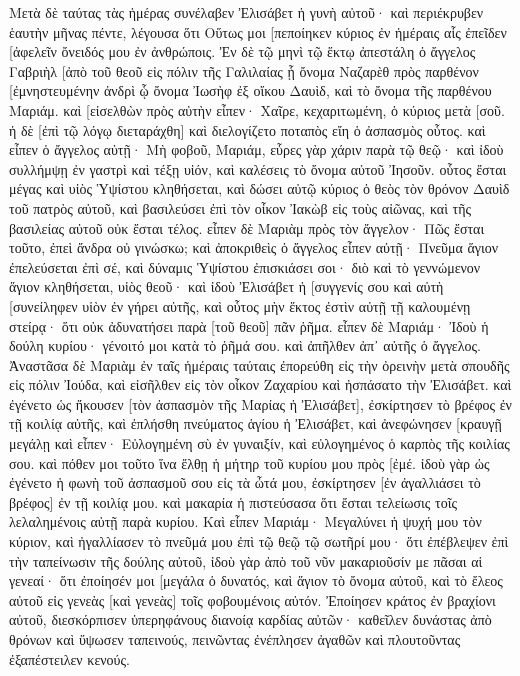 Μετὰ δὲ ταύτας τὰς ἡμέρας συνέλαβεν Ἐλισάβετ ἡ γυνὴ αὐτοῦ· καὶ περιέκρυβεν ἑαυτὴν μῆνας πέντε, λέγουσα 
ὅτι Οὕτως μοι [πεποίηκεν κύριος ἐν ἡμέραις αἷς ἐπεῖδεν [ἀφελεῖν ὄνειδός μου ἐν ἀνθρώποις. 
Ἐν δὲ τῷ μηνὶ τῷ ἕκτῳ ἀπεστάλη ὁ ἄγγελος Γαβριὴλ [ἀπὸ τοῦ θεοῦ εἰς πόλιν τῆς Γαλιλαίας ᾗ ὄνομα Ναζαρὲθ 
πρὸς παρθένον [ἐμνηστευμένην ἀνδρὶ ᾧ ὄνομα Ἰωσὴφ ἐξ οἴκου Δαυὶδ, καὶ τὸ ὄνομα τῆς παρθένου Μαριάμ. 
καὶ [εἰσελθὼν πρὸς αὐτὴν εἶπεν· Χαῖρε, κεχαριτωμένη, ὁ κύριος μετὰ [σοῦ. 
ἡ δὲ [ἐπὶ τῷ λόγῳ διεταράχθη] καὶ διελογίζετο ποταπὸς εἴη ὁ ἀσπασμὸς οὗτος. 
καὶ εἶπεν ὁ ἄγγελος αὐτῇ· Μὴ φοβοῦ, Μαριάμ, εὗρες γὰρ χάριν παρὰ τῷ θεῷ· 
καὶ ἰδοὺ συλλήμψῃ ἐν γαστρὶ καὶ τέξῃ υἱόν, καὶ καλέσεις τὸ ὄνομα αὐτοῦ Ἰησοῦν. 
οὗτος ἔσται μέγας καὶ υἱὸς Ὑψίστου κληθήσεται, καὶ δώσει αὐτῷ κύριος ὁ θεὸς τὸν θρόνον Δαυὶδ τοῦ πατρὸς αὐτοῦ, 
καὶ βασιλεύσει ἐπὶ τὸν οἶκον Ἰακὼβ εἰς τοὺς αἰῶνας, καὶ τῆς βασιλείας αὐτοῦ οὐκ ἔσται τέλος. 
εἶπεν δὲ Μαριὰμ πρὸς τὸν ἄγγελον· Πῶς ἔσται τοῦτο, ἐπεὶ ἄνδρα οὐ γινώσκω; 
καὶ ἀποκριθεὶς ὁ ἄγγελος εἶπεν αὐτῇ· Πνεῦμα ἅγιον ἐπελεύσεται ἐπὶ σέ, καὶ δύναμις Ὑψίστου ἐπισκιάσει σοι· διὸ καὶ τὸ γεννώμενον ἅγιον κληθήσεται, υἱὸς θεοῦ· 
καὶ ἰδοὺ Ἐλισάβετ ἡ [συγγενίς σου καὶ αὐτὴ [συνείληφεν υἱὸν ἐν γήρει αὐτῆς, καὶ οὗτος μὴν ἕκτος ἐστὶν αὐτῇ τῇ καλουμένῃ στείρᾳ· 
ὅτι οὐκ ἀδυνατήσει παρὰ [τοῦ θεοῦ] πᾶν ῥῆμα. 
εἶπεν δὲ Μαριάμ· Ἰδοὺ ἡ δούλη κυρίου· γένοιτό μοι κατὰ τὸ ῥῆμά σου. καὶ ἀπῆλθεν ἀπ᾽ αὐτῆς ὁ ἄγγελος. 
Ἀναστᾶσα δὲ Μαριὰμ ἐν ταῖς ἡμέραις ταύταις ἐπορεύθη εἰς τὴν ὀρεινὴν μετὰ σπουδῆς εἰς πόλιν Ἰούδα, 
καὶ εἰσῆλθεν εἰς τὸν οἶκον Ζαχαρίου καὶ ἠσπάσατο τὴν Ἐλισάβετ. 
καὶ ἐγένετο ὡς ἤκουσεν [τὸν ἀσπασμὸν τῆς Μαρίας ἡ Ἐλισάβετ], ἐσκίρτησεν τὸ βρέφος ἐν τῇ κοιλίᾳ αὐτῆς, καὶ ἐπλήσθη πνεύματος ἁγίου ἡ Ἐλισάβετ, 
καὶ ἀνεφώνησεν [κραυγῇ μεγάλῃ καὶ εἶπεν· Εὐλογημένη σὺ ἐν γυναιξίν, καὶ εὐλογημένος ὁ καρπὸς τῆς κοιλίας σου. 
καὶ πόθεν μοι τοῦτο ἵνα ἔλθῃ ἡ μήτηρ τοῦ κυρίου μου πρὸς [ἐμέ. 
ἰδοὺ γὰρ ὡς ἐγένετο ἡ φωνὴ τοῦ ἀσπασμοῦ σου εἰς τὰ ὦτά μου, ἐσκίρτησεν [ἐν ἀγαλλιάσει τὸ βρέφος] ἐν τῇ κοιλίᾳ μου. 
καὶ μακαρία ἡ πιστεύσασα ὅτι ἔσται τελείωσις τοῖς λελαλημένοις αὐτῇ παρὰ κυρίου. 
Καὶ εἶπεν Μαριάμ· Μεγαλύνει ἡ ψυχή μου τὸν κύριον, 
καὶ ἠγαλλίασεν τὸ πνεῦμά μου ἐπὶ τῷ θεῷ τῷ σωτῆρί μου· 
ὅτι ἐπέβλεψεν ἐπὶ τὴν ταπείνωσιν τῆς δούλης αὐτοῦ, ἰδοὺ γὰρ ἀπὸ τοῦ νῦν μακαριοῦσίν με πᾶσαι αἱ γενεαί· 
ὅτι ἐποίησέν μοι [μεγάλα ὁ δυνατός, καὶ ἅγιον τὸ ὄνομα αὐτοῦ, 
καὶ τὸ ἔλεος αὐτοῦ εἰς γενεὰς [καὶ γενεὰς] τοῖς φοβουμένοις αὐτόν. 
Ἐποίησεν κράτος ἐν βραχίονι αὐτοῦ, διεσκόρπισεν ὑπερηφάνους διανοίᾳ καρδίας αὐτῶν· 
καθεῖλεν δυνάστας ἀπὸ θρόνων καὶ ὕψωσεν ταπεινούς, 
πεινῶντας ἐνέπλησεν ἀγαθῶν καὶ πλουτοῦντας ἐξαπέστειλεν κενούς. 
